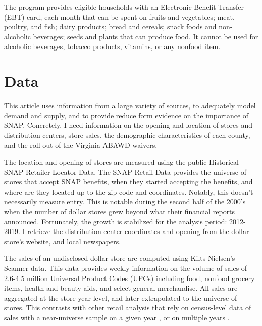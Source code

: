 \documentclass[11.5pt]{article}
\begin{document}

The program provides eligible households with an Electronic Benefit Transfer (EBT) card, each month that can be spent on fruits and vegetables; meat, poultry, and fish; dairy products; bread and cereals; snack foods and non-alcoholic beverages; seeds and plants that can produce food. It cannot be used for alcoholic beverages, tobacco products, vitamins, or any nonfood item. 











\section{Data}

This article uses information from a large variety of sources, to adequately model demand and supply, and to provide reduce form evidence on the importance of SNAP. Concretely, I need information on the opening and location of stores and distribution centers, store sales, the demographic characteristics of each county, and the roll-out of the Virginia ABAWD waivers. 

The location and opening of stores are measured using the public Historical SNAP Retailer Locator Data. The SNAP Retail Data provides the universe of stores that accept SNAP benefits, when they started accepting the benefits, and where are they located up to the zip code and coordinates. Notably, this doesn't necessarily measure entry. This is notable during the second half of the 2000's when the number of dollar stores grew beyond what their financial reports announced. Fortunately, the growth is stabilized for the analysis period: 2012-2019. I retrieve the distribution center coordinates and opening from the dollar store's website, and local newspapers.

The sales of an undisclosed dollar store are computed using Kilts-Nielsen's Scanner data. This data provides weekly information on the volume of sales of 2.6-4.5 million Universal Product Codes (UPCs) including food, nonfood grocery items, health and beauty aids, and select general merchandise. All sales are aggregated at the store-year level, and later extrapolated to the universe of stores. This contrasts with other retail analysis that rely on census-level data of sales with a near-universe sample on a given year \cite{holmes2011diffusion}, or on multiple years \cite{ellickson2020measuring,chenarides2021dollar}. 
\end{document}
